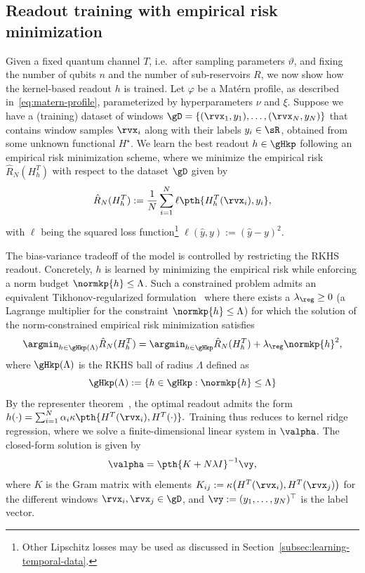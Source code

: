 \subsection{Readout training with empirical risk minimization}\label{subsec:readout-training}
Given a fixed quantum channel $T$, i.e.\ after sampling parameters $\vartheta$, and fixing the number of qubits $n$ and the number of sub-reservoirs $R$, we now show how the kernel-based readout $h$ is trained. 
Let $\varphi$ be a Mat\'ern profile, as described in~\cref{eq:matern-profile}, parameterized by hyperparameters $\nu$ and $\xi$. Suppose we have a (training) dataset of windows $\gD = \{(\rvx_1, y_1), \dots, (\rvx_N, y_N) \}$ that contains window samples $\rvx_i$ along with their labels $y_i \in \sR$, obtained from some unknown functional $H^\star$. We learn the best readout $h \in \gHkp$ following an empirical risk minimization scheme, where we minimize the empirical risk $\hat{R}_N(H^T_h)$ with respect to the dataset $\gD$ given by
\begin{equation}\label{eq:empirical-risk-proxy}
    \hat{R}_N(H^T_h) := \frac{1}{N} \sum_{i=1}^N \ell\pth{H^T_h(\rvx_i), y_i},
\end{equation}
with $\ell$ being the squared loss function\footnote{Other Lipschitz losses may be used as discussed in Section~\ref{subsec:learning-temporal-data}.} $\ell(\hat{y}, y) := (\hat{y} - y)^2$.

The bias-variance tradeoff of the model is controlled by restricting the RKHS readout. Concretely, $h$ is learned by minimizing the empirical risk while enforcing a norm budget $\normkp{h} \leq \Lambda$. Such a constrained problem admits an equivalent Tikhonov-regularized formulation~\cite{scholkopf2001learning} where there exists a $\lambda_{\rm \reg} \geq 0$ (a Lagrange multiplier for the constraint $\normkp{h} \le \Lambda$) for which the solution of the norm-constrained empirical risk minimization satisfies
\begin{equation}
    \argmin_{h\in \gHkp(\Lambda)} \hat{R}_N(H^T_h) = \argmin_{h \in \gHkp} \hat{R}_N(H^T_h) + \lambda_{\rm \reg} \normkp{h}^2,
\end{equation}
where $\gHkp(\Lambda)$ is the RKHS ball of radius $\Lambda$ defined as 
\begin{equation}
    \gHkp(\Lambda) := \{h \in \gHkp : \normkp{h} \leq \Lambda\}
\end{equation}
By the representer theorem~\cite{Hofmann_Schölkopf_Smola_2008}, the optimal readout admits the form $h(\cdot) = \sum_{i=1}^N \alpha_i \kappa\pth{H^T(\rvx_i), H^T(\cdot)}.$ Training thus reduces to kernel ridge regression, where we solve a finite-dimensional linear system in $\valpha$. The closed-form solution is given by
\begin{equation}
    \valpha = \pth{K + N \lambda I}^{-1} \vy,
\end{equation}
where $K$ is the Gram matrix with elements $K_{ij} := \kappa\big(H^T(\rvx_i), H^T(\rvx_j)\big)$ for the different windows $\rvx_i, \rvx_j \in \gD$, and $\vy := (y_1, \ldots, y_N)^\top$ is the label vector.
